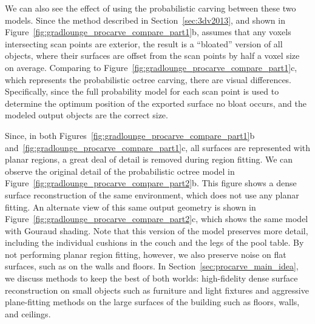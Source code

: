 \documentclass[12pt,onecolumn,oneside]{book}
\begin{document}
We can also see the effect of using the probabilistic carving between these two models.  Since the method described in Section~\ref{sec:3dv2013}, and shown in Figure~\ref{fig:gradlounge_procarve_compare_part1}b, assumes that any voxels intersecting scan points are exterior, the result is a ``bloated'' version of all objects, where their surfaces are offset from the scan points by half a voxel size on average.  Comparing to Figure~\ref{fig:gradlounge_procarve_compare_part1}c, which represents the probabilistic octree carving, there are visual differences.  Specifically, since the full probability model for each scan point is used to determine the optimum position of the exported surface no bloat occurs, and the modeled output objects are the correct size.

Since, in both Figures~\ref{fig:gradlounge_procarve_compare_part1}b and~\ref{fig:gradlounge_procarve_compare_part1}c, all surfaces are represented with planar regions, a great deal of detail is removed during region fitting.  We can observe the original detail of the probabilistic octree model in Figure~\ref{fig:gradlounge_procarve_compare_part2}b.  This figure shows a dense surface reconstruction of the same environment, which does not use any planar fitting.  An alternate view of this same output geometry is shown in Figure~\ref{fig:gradlounge_procarve_compare_part2}c, which shows the same model with Gouraud shading.  Note that this version of the model preserves more detail, including the individual cushions in the couch and the legs of the pool table.  By not performing planar region fitting, however, we also preserve noise on flat surfaces, such as on the walls and floors.  In Section~\ref{sec:procarve_main_idea}, we discuss methods to keep the best of both worlds:  high-fidelity dense surface reconstruction on small objects such as furniture and light fixtures and aggressive plane-fitting methods on the large surfaces of the building such as floors, walls, and ceilings.
\end{document}
